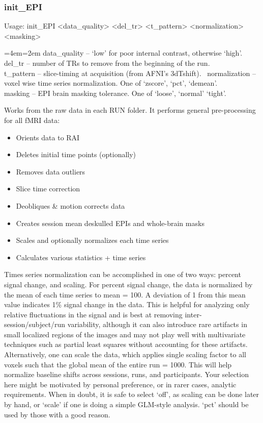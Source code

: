 \documentclass[final,titlepage,letterpaper,oneside,12pt]{article}
\renewcommand{\texttt}[2][BrickRed]{\textcolor{#1}{\ttfamily #2}}%
\newenvironment{blockquote}{%
  \par%
  \medskip
  \leftskip=4em\rightskip=2em%
  \noindent\ignorespaces}{%
  \par\medskip}
\begin{document}
\subsubsection{init\_EPI}
Usage: \texttt{init\_EPI <data\_quality> <del\_tr> <t\_pattern> <normalization> <masking>}

\begin{blockquote}
data\_quality -- `low' for poor internal contrast, otherwise `high'. \\
del\_tr -- number of TRs to remove from the beginning of the run. \\
t\_pattern -- slice-timing at acquisition (from AFNI's 3dTshift). \
normalization -- voxel wise time series normalization. One of `zscore', `pct', `demean'. \\
masking -- EPI brain masking tolerance. One of `loose', `normal' `tight'. \
\end{blockquote}

\noindent Works from the raw data in each RUN folder. It performs general pre-processing for all fMRI data:

\begin{itemize} \itemsep-2pt
    \item{Orients data to RAI}
    \item{Deletes initial time points (optionally)}
    \item{Removes data outliers}
    \item{Slice time correction}
    \item{Deobliques \& motion corrects data}
    \item{Creates session mean deskulled EPIs and whole-brain masks}
    \item{Scales and optionally normalizes each time series}
    \item{Calculates various statistics + time series}
\end{itemize}

Times series normalization can be accomplished in one of two ways: percent signal change, and scaling. For percent signal change, the data is normalized by the mean of each time series to mean = 100. A deviation of 1 from this mean value indicates 1\% signal change in the data. This is helpful for analyzing only relative fluctuations in the signal and is best at removing inter-session/subject/run variability, although it can also introduce rare artifacts in small localized regions of the images and may not play well with multivariate techniques such as partial least squares without accounting for these artifacts. Alternatively, one can scale the data, which applies single scaling factor to all voxels such that the global mean of the entire run = 1000. This will help normalize baseline shifts across sessions, runs, and participants. Your selection here might be motivated by personal preference, or in rarer cases, analytic requirements. When in doubt, it is safe to select `off', as scaling can be done later by hand, or `scale' if one is doing a simple GLM-style analysis. `pct' should be used by those with a good reason.
\end{document}
